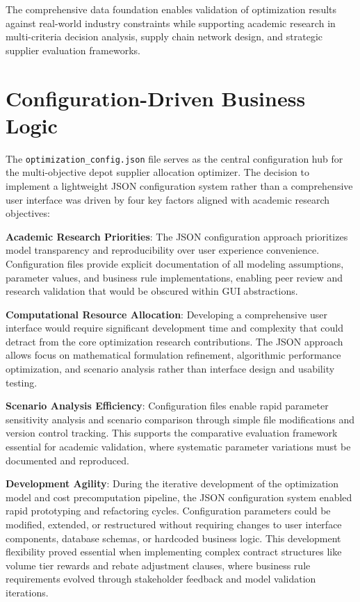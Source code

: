 The comprehensive data foundation enables validation of optimization results against real-world industry constraints while supporting academic research in multi-criteria decision analysis, supply chain network design, and strategic supplier evaluation frameworks.



\section{Configuration-Driven Business Logic}
The \texttt{optimization\_config.json} file serves as the central configuration hub for the multi-objective depot supplier allocation optimizer. The decision to implement a lightweight JSON configuration system rather than a comprehensive user interface was driven by four key factors aligned with academic research objectives:

\textbf{Academic Research Priorities}: The JSON configuration approach prioritizes model transparency and reproducibility over user experience convenience. Configuration files provide explicit documentation of all modeling assumptions, parameter values, and business rule implementations, enabling peer review and research validation that would be obscured within GUI abstractions.

\textbf{Computational Resource Allocation}: Developing a comprehensive user interface would require significant development time and complexity that could detract from the core optimization research contributions. The JSON approach allows focus on mathematical formulation refinement, algorithmic performance optimization, and scenario analysis rather than interface design and usability testing.

\textbf{Scenario Analysis Efficiency}: Configuration files enable rapid parameter sensitivity analysis and scenario comparison through simple file modifications and version control tracking. This supports the comparative evaluation framework essential for academic validation, where systematic parameter variations must be documented and reproduced.

\textbf{Development Agility}: During the iterative development of the optimization model and cost precomputation pipeline, the JSON configuration system enabled rapid prototyping and refactoring cycles. Configuration parameters could be modified, extended, or restructured without requiring changes to user interface components, database schemas, or hardcoded business logic. This development flexibility proved essential when implementing complex contract structures like volume tier rewards and rebate adjustment clauses, where business rule requirements evolved through stakeholder feedback and model validation iterations.

